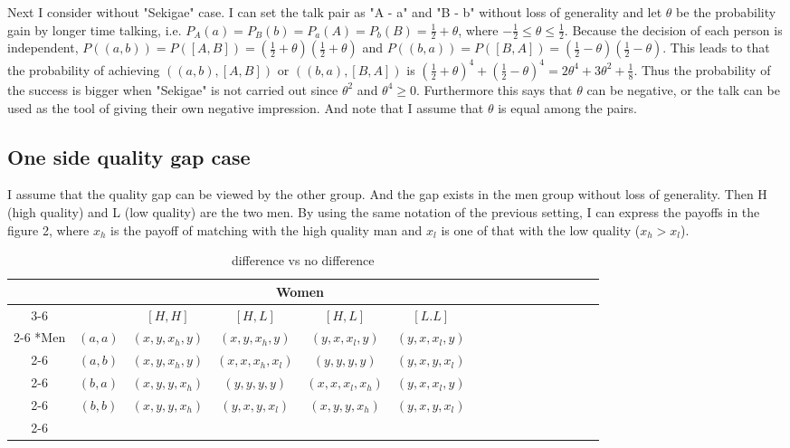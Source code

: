 \documentclass{article}
\begin{document}
	\par
	Next I consider without "Sekigae" case. I can set the talk pair as "A - a" and "B - b" without loss of generality and let $\theta$ be the probability gain by longer time talking, i.e. $P_A(a)= P_B(b) = P_a(A) = P_b(B) = \frac{1}{2} + \theta$, where $-\frac{1}{2} \leq\theta \leq \frac{1}{2}$. Because the decision of each person is independent, $P((a,b)) = P([A, B]) = \left( \frac{1}{2} + \theta \right) \left( \frac{1}{2} + \theta\right)$ and $P((b, a)) = P([B, A]) =  \left( \frac{1}{2} - \theta \right) \left( \frac{1}{2} - \theta\right)$. This leads to that the probability of achieving $\left( (a, b), [A, B] \right)$ or $\left( (b, a), [B, A] \right)$ is $ \left( \frac{1}{2} + \theta \right)^4 + \left( \frac{1}{2} - \theta\right)^4 = 2\theta^4 + 3\theta^2 + \frac{1}{8}$.
	Thus the probability of the success is bigger when "Sekigae" is not carried out since $\theta^2$ and $\theta^4 \geq 0$. Furthermore this says that $\theta$ can be negative, or the talk can be used as the tool of giving their own negative impression. And note that I assume that $\theta$ is equal among the pairs.

	\subsection{One side quality gap case}
	I assume that the quality gap can be viewed by the other group. And the gap exists in the men group without loss of generality. Then H (high quality) and L (low quality) are the two men. By using the same notation of the previous setting, I can express the payoffs in the figure 2, where $x_h$ is the payoff of matching with the high quality man and $x_l$ is one of that with the low quality ($x_h > x_l$).
	
	\begin{table}[h]
		\begin{center}
                \setlength{\extrarowheight}{2pt}
                \begin{tabular}{*{16}{c|}}
                  \multicolumn{2}{c}{} & \multicolumn{1}{c}{} & \multicolumn{2}{c}{Women}\\\cline{3-6}
                  \multicolumn{1}{c}{} &  & $[H, H]$  & $[H, L]$ & $[H, L]$ & $[L.L]$\\\cline{2-6}
                  \multirow{4}*{Men}  & $(a,a)$ & $(x,y,x_h,y)$ & $(x,y,x_h,y)$ & $(y,x,x_l,y)$ & $(y,x,x_l,y)$\\\cline{2-6}
                  & $(a,b)$ & $(x,y,x_h,y)$ & $(x,x,x_h,x_l)$ & $(y,y,y,y)$ & $(y,x,y,x_l)$\\\cline{2-6}
                  & $(b,a)$ & $(x,y,y,x_h)$ & $(y,y,y,y)$ & $(x,x,x_l,x_h)$ & $(y,x,x_l,y)$\\\cline{2-6}
                  & $(b,b)$ & $(x,y,y,x_h)$ & $(y,x,y,x_l)$ & $(x,y,y,x_h)$ & $(y,x,y,x_l)$\\\cline{2-6}
                \end{tabular}
                \end{center}
                \caption{difference vs no difference}
          \end{table}
          
\end{document}
